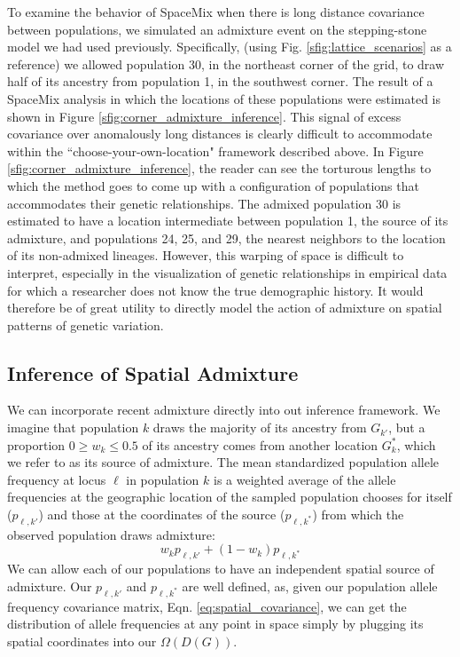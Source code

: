 \documentclass[12pt]{article}
\newcommand{\kadmixsource}[1]{{$G^{*}_{#1}$}}
\newcommand{\identifyadmixsource}[1]{{#1^{*}}}
\begin{document}
To examine the behavior of SpaceMix when there is long distance covariance between populations, we simulated an admixture event on the stepping-stone model we had used previously.  Specifically, (using Fig. \ref{sfig:lattice_scenarios} as a reference) we allowed population 30, in the northeast corner of the grid, to draw half of its ancestry from population 1, in the southwest corner.  The result of a SpaceMix analysis in which the locations of these populations were estimated is shown in Figure \ref{sfig:corner_admixture_inference}.
This signal of excess covariance over anomalously long distances is clearly difficult to accommodate within the ``choose-your-own-location" framework described above.  In Figure \ref{sfig:corner_admixture_inference}, the reader can see the torturous lengths to which the method goes to come up with a configuration of populations that accommodates their genetic relationships.  The admixed population 30 is estimated to have a location intermediate between population 1, the source of its admixture, and populations 24, 25, and 29, the nearest neighbors to the location of its non-admixed lineages.  However, this warping of space is difficult to interpret, especially in the visualization of genetic relationships in empirical data for which a researcher does not know the true demographic history.  It would therefore be of great utility to directly model the action of admixture on spatial patterns of genetic variation.

\subsection*{Inference of Spatial Admixture}
We can incorporate recent admixture directly into out inference framework.  We imagine that population $k$ draws the majority of its ancestry from $G_{k'}$, but a proportion $0 \geq w_k \leq 0.5$ of its ancestry comes from another location \kadmixsource{k}, which we refer to as its source of admixture. The mean standardized population allele frequency at locus $\ell$ in population $k$ is a weighted average of the allele frequencies at the geographic location of the sampled population chooses for itself ($p_{\ell,k'}$) and those at the coordinates of the source ($p_{\ell,\identifyadmixsource{k}}$) from which the observed population draws admixture:
\begin{equation}
w_k p_{\ell,k'} + (1-w_k) p_{\ell,\identifyadmixsource{k}} \label{eqn-admixedfreq}
\end{equation}
We can allow each of our populations to have an independent spatial source of admixture. Our $p_{\ell,k'}$ and $p_{\ell,\identifyadmixsource{k}} $ are well defined, as, given our population allele frequency covariance matrix, Eqn. \ref{eq:spatial_covariance}, we can get the distribution of allele frequencies at any point in space simply by plugging its spatial coordinates into our $\Omega(D(G))$.
\end{document}
